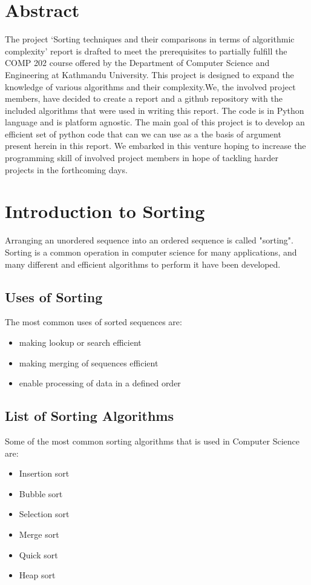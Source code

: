 \documentclass{article}
\begin{document}
\section*{Abstract}
The project ‘Sorting techniques and their comparisons in terms of algorithmic complexity’ 
report is drafted to meet the prerequisites to partially fulfill the COMP 202 course offered 
by the Department of Computer Science and Engineering at Kathmandu University. This project 
is designed to expand the knowledge of various algorithms and their complexity.We, the involved 
project members, have decided to create a report and a github repository with the included 
algorithms that were used in writing this report. The code is in Python language and  is 
platform agnostic. The main goal of this project is to develop an efficient set of python 
code that can we can use as a the basis of argument present herein in this report. We embarked 
in this venture hoping to increase the programming skill of involved project members in hope 
of tackling harder projects in the forthcoming days.

\clearpage
\thispagestyle{empty}
\tableofcontents

\clearpage
\thispagestyle{empty}
\listoffigures

\clearpage
{}
\section{Introduction to Sorting}
Arranging an unordered sequence into an ordered sequence is called "sorting".
Sorting is a common operation in computer science for many applications, and many different and 
efficient algorithms to perform it have been developed.

\vspace*{5mm}
\subsection{Uses of Sorting}
The most common uses of sorted sequences are:
\begin{itemize}
    \item making lookup or search efficient
    \item making merging of sequences efficient
    \item enable processing of data in a defined order
\end{itemize}

\vspace*{5mm}
\subsection{List of Sorting Algorithms}
Some of the most common sorting algorithms that is used in Computer Science are:
\begin{itemize}
    \item Insertion sort
    \item Bubble sort
    \item Selection sort
    \item Merge sort
    \item Quick sort
    \item Heap sort
\end{itemize}
\clearpage
\end{document}
